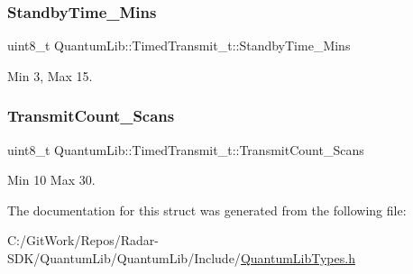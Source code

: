 \subsubsection{\texorpdfstring{Standby\+Time\+\_\+\+Mins}{StandbyTime\_Mins}}
{\footnotesize\ttfamily uint8\+\_\+t Quantum\+Lib\+::\+Timed\+Transmit\+\_\+t\+::\+Standby\+Time\+\_\+\+Mins}



Min 3, Max 15. 

\mbox{\label{struct_quantum_lib_1_1_timed_transmit__t_a3ee8c45d36a8f1ea0c6433b294f1ca0e}} 
\subsubsection{\texorpdfstring{Transmit\+Count\+\_\+\+Scans}{TransmitCount\_Scans}}
{\footnotesize\ttfamily uint8\+\_\+t Quantum\+Lib\+::\+Timed\+Transmit\+\_\+t\+::\+Transmit\+Count\+\_\+\+Scans}



Min 10 Max 30. 



The documentation for this struct was generated from the following file\+:\begin{DoxyCompactItemize}
\item 
C\+:/\+Git\+Work/\+Repos/\+Radar-\/\+S\+D\+K/\+Quantum\+Lib/\+Quantum\+Lib/\+Include/\mbox{\hyperlink{_quantum_lib_types_8h}{Quantum\+Lib\+Types.\+h}}\end{DoxyCompactItemize}

